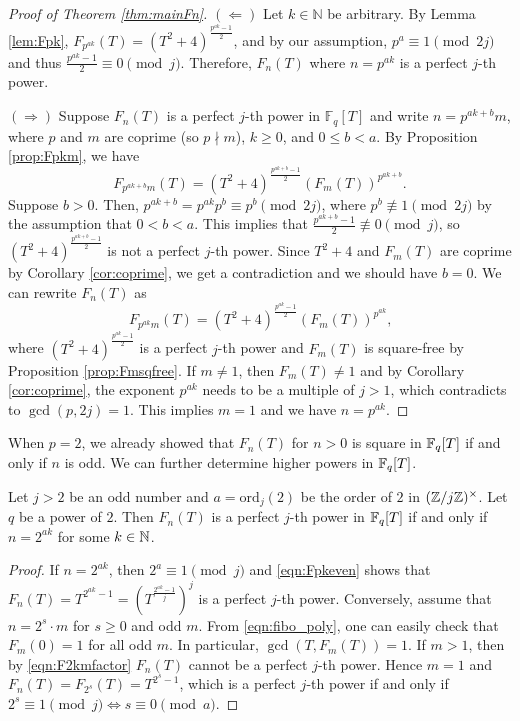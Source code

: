 \begin{proof}[Proof of Theorem \ref{thm:mainFn}]
    $(\Leftarrow)$ Let $k \in \mathbb{N}$ be arbitrary. By Lemma \ref{lem:Fpk}, $F_{p^{ak}}(T) = (T^2 +4)^{\frac{p^{ak} - 1}{2}}$, and by our assumption, $p^a \equiv 1 \pmod {2j}$ and thus $\frac{p^{ak} - 1}{2} \equiv 0 \pmod j$. Therefore, $F_n(T)$ where $n = p^{ak}$ is a perfect $j$-th power.
    
    $(\Rightarrow)$ Suppose $F_n(T)$ is a perfect $j$-th power in $\mathbb{F}_q[T]$ and write $n = p^{ak + b}m$, where $p$ and $m$ are coprime (so $p \nmid m$), $k \geq 0$, and \(0 \le b < a\). By Proposition \ref{prop:Fpkm}, we have
    \[
        F_{p^{ak + b}m}(T) = (T^2 + 4)^\frac{p^{ak + b} - 1}{2} \left(F_m(T)\right)^{p^{ak + b}} \text{.}
    \]
    Suppose $b > 0$. Then, $p^{ak + b} = p^{ak}p^b \equiv p^b \pmod{2j}$, where $p^b \not \equiv 1 \pmod{2j}$ by the assumption that $0 < b < a$. This implies that $\frac{p^{ak + b} - 1}{2} \not \equiv 0 \pmod j$, so $(T^2 + 4)^\frac{p^{ak + b} - 1}{2}$ is not a perfect $j$-th power.
    Since \(T^2 + 4\) and \(F_m(T)\) are coprime by Corollary \ref{cor:coprime}, we get a contradiction and we should have \(b = 0\).
    We can rewrite \(F_n(T)\) as
    \[
        F_{p^{ak}m}(T) = (T^2 + 4)^\frac{p^{ak} - 1}{2} \left(F_m(T)\right)^{p^{ak}} \text{,}
    \]
    where \((T^2 + 4)^{\frac{p^{ak} - 1}{2}}\) is a perfect \(j\)-th power and \(F_m(T)\) is square-free by Proposition \ref{prop:Fmsqfree}. If \(m \ne 1\), then \(F_m(T) \ne 1\) and by Corollary \ref{cor:coprime}, the exponent \(p^{ak}\) needs to be a multiple of \(j > 1\), which contradicts to \( \gcd(p, 2j) = 1\).
    This implies \(m = 1\) and we have \(n = p^{ak}\).
\end{proof}

When \(p = 2\), we already showed that \(F_n(T)\) for $n > 0$ is square in \(\mathbb{F}_q[T]\) if and only if \(n\) is odd. We can further determine higher powers in \(\mathbb{F}_q[T]\).
\begin{theorem}
\label{thm:mainFnp2}
    Let \(j > 2\) be an odd number and \(a = \mathrm{ord}_j(2)\) be the order of \(2\) in \((\mathbb{Z}/j\mathbb{Z})^\times\).
    Let $q$ be a power of $2$.
    Then \(F_n(T)\) is a perfect \(j\)-th power in $\mathbb{F}_q[T]$ if and only if \(n = 2^{ak}\) for some \(k \in \mathbb{N}\).
\end{theorem}
\begin{proof}
    If $n = 2^{ak}$, then $2^a \equiv 1 \pmod{j}$ and \eqref{eqn:Fpkeven} shows that $F_{n}(T) = T^{2^{ak} - 1} = (T^{\frac{2^{ak} - 1}{j}})^{j}$ is a perfect $j$-th power.
    Conversely, assume that $n = 2^{s} \cdot m$ for $s \ge 0$ and odd $m$.
    From \eqref{eqn:fibo_poly}, one can easily check that $F_m(0) = 1$ for all odd $m$.
    In particular, $\gcd(T, F_m(T)) = 1$.
    If $m > 1$, then by \eqref{eqn:F2kmfactor} $F_n(T)$ cannot be a perfect $j$-th power.
    Hence $m = 1$ and $F_n(T) = F_{2^s}(T) = T^{2^{s} - 1}$, which is a perfect $j$-th power if and only if $2^s \equiv 1 \pmod{j} \Leftrightarrow s \equiv 0 \pmod{a}$.
\end{proof}

